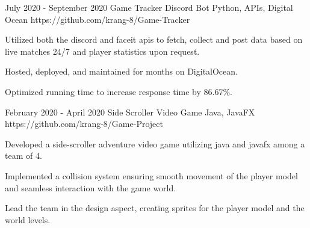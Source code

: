 \documentclass[]{awesome-cv}
\begin{document}
\begin{cventries}
	  \cventry
    {July 2020 - September 2020} %
    {Game Tracker Discord Bot}
    {Python, APIs, Digital Ocean} %
    {https://github.com/krang-8/Game-Tracker} %
    {
      \begin{cvitems} %
        \item {Utilized both the discord and faceit apis to fetch, collect and post data based on live matches 24/7 and player statistics upon request.}
        \item {Hosted, deployed, and maintained for months on DigitalOcean.}
        \item {Optimized running time to increase response time by 86.67\%.}
      \end{cvitems}
    }


	
	
	\vspace{1mm}
		  \cventry
	{February 2020 - April 2020}
	{Side Scroller Video Game}
	{Java, JavaFX}
	{https://github.com/krang-8/Game-Project}
    {
      \begin{cvitems} %
        \item {Developed a side-scroller adventure video game utilizing java and javafx among a team of 4.}
        \item {Implemented a collision system ensuring smooth movement of the player model and seamless interaction with the game world.}
        \item {Lead the team in the design aspect, creating sprites for the player model and the world levels.}
      \end{cvitems}
    }

\end{cventries}


\vspace{-5mm}
\end{document}
